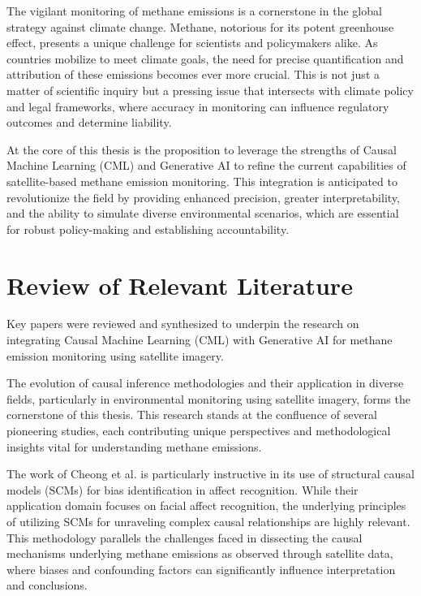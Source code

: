 The vigilant monitoring of methane emissions is a cornerstone in the global strategy against climate change. Methane, notorious for its potent greenhouse effect, presents a unique challenge for scientists and policymakers alike. As countries mobilize to meet climate goals, the need for precise quantification and attribution of these emissions becomes ever more crucial. This is not just a matter of scientific inquiry but a pressing issue that intersects with climate policy and legal frameworks, where accuracy in monitoring can influence regulatory outcomes and determine liability.

At the core of this thesis is the proposition to leverage the strengths of Causal Machine Learning (CML) and Generative AI to refine the current capabilities of satellite-based methane emission monitoring. This integration is anticipated to revolutionize the field by providing enhanced precision, greater interpretability, and the ability to simulate diverse environmental scenarios, which are essential for robust policy-making and establishing accountability.


\section{Review of Relevant Literature}
Key papers were reviewed and synthesized to underpin the research on integrating Causal Machine Learning (CML) with Generative AI for methane emission monitoring using satellite imagery.

The evolution of causal inference methodologies and their application in diverse fields, particularly in environmental monitoring using satellite imagery, forms the cornerstone of this thesis. This research stands at the confluence of several pioneering studies, each contributing unique perspectives and methodological insights vital for understanding methane emissions.

The work of Cheong et al. \cite{cheong2023} is particularly instructive in its use of structural causal models (SCMs) for bias identification in affect recognition. While their application domain focuses on facial affect recognition, the underlying principles of utilizing SCMs for unraveling complex causal relationships are highly relevant. This methodology parallels the challenges faced in dissecting the causal mechanisms underlying methane emissions as observed through satellite data, where biases and confounding factors can significantly influence interpretation and conclusions.

